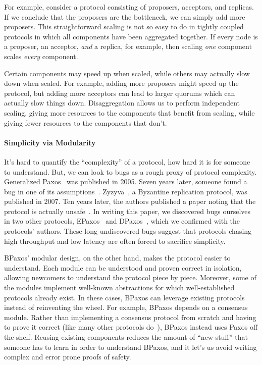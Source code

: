 For example, consider a protocol consisting of proposers, acceptors, and
replicas. If we conclude that the proposers are the bottleneck, we can simply
add more proposers. This straightforward scaling is not so easy to do in
tightly coupled protocols in which all components have been aggregated
together. If every node is a proposer, an acceptor, \emph{and} a replica, for
example, then scaling \emph{one} component scales \emph{every} component.

Certain components may speed up when scaled, while others may actually slow
down when scaled.  For example, adding more proposers might speed up the
protocol, but adding more acceptors can lead to larger quorums which can
actually slow things down. Disaggregation allows us to perform independent
scaling, giving more resources to the components that benefit from scaling,
while giving fewer resources to the components that don't.

\paragraph{Simplicity via Modularity}
It's hard to quantify the ``complexity'' of a protocol, how hard it is for
someone to understand. But, we can look to bugs as a rough proxy of protocol
complexity. Generalized Paxos~\cite{lamport2005generalized} was published in
2005. Seven years later, someone found a bug in one of its
assumptions~\cite{sutra2011fast}.  Zyzyva~\cite{kotla2007zyzzyva}, a Byzantine
replication protocol, was published in 2007. Ten years later, the authors
published a paper noting that the protocol is actually
unsafe~\cite{abraham2017revisiting}. In writing this paper, we discovered bugs
ourselves in two other protocols, EPaxos~\cite{moraru2013there} and
DPaxos~\cite{nawab2018dpaxos}, which we confirmed with the protocols' authors.
These long undiscovered bugs suggest that protocols chasing high throughput and
low latency are often forced to sacrifice simplicity.

BPaxos' modular design, on the other hand, makes the protocol easier to
understand. Each module can be understood and proven correct in isolation,
allowing newcomers to understand the protocol piece by piece. Moreover, some of
the modules implement well-known abstractions for which well-established
protocols already exist. In these cases, BPaxos can leverage existing protocols
instead of reinventing the wheel. For example, BPaxos depends on a consensus
module. Rather than implementing a consensus protocol from scratch and having
to prove it correct (like many other protocols do~\cite{moraru2013there,
arun2017speeding, nawab2018dpaxos}), BPaxos instead uses Paxos off the shelf.
Reusing existing components reduces the amount of ``new stuff'' that someone
has to learn in order to understand BPaxos, and it let's us avoid writing
complex and error prone proofs of safety.

